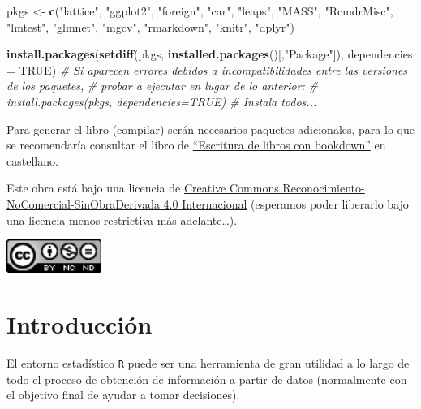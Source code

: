 \documentclass[]{book}
\newenvironment{Shaded}{\begin{snugshade}}{\end{snugshade}}
\newcommand{\CommentTok}[1]{\textcolor[rgb]{0.56,0.35,0.01}{\textit{#1}}}
\newcommand{\DataTypeTok}[1]{\textcolor[rgb]{0.13,0.29,0.53}{#1}}
\newcommand{\KeywordTok}[1]{\textcolor[rgb]{0.13,0.29,0.53}{\textbf{#1}}}
\newcommand{\NormalTok}[1]{#1}
\newcommand{\OtherTok}[1]{\textcolor[rgb]{0.56,0.35,0.01}{#1}}
\newcommand{\StringTok}[1]{\textcolor[rgb]{0.31,0.60,0.02}{#1}}
\begin{document}
\begin{Shaded}
\begin{Highlighting}[]
\NormalTok{pkgs <-}\StringTok{ }\KeywordTok{c}\NormalTok{(}\StringTok{"lattice"}\NormalTok{, }\StringTok{"ggplot2"}\NormalTok{, }\StringTok{"foreign"}\NormalTok{, }\StringTok{"car"}\NormalTok{, }\StringTok{"leaps"}\NormalTok{, }\StringTok{"MASS"}\NormalTok{, }\StringTok{"RcmdrMisc"}\NormalTok{, }
          \StringTok{"lmtest"}\NormalTok{, }\StringTok{"glmnet"}\NormalTok{, }\StringTok{"mgcv"}\NormalTok{, }\StringTok{"rmarkdown"}\NormalTok{, }\StringTok{"knitr"}\NormalTok{, }\StringTok{"dplyr"}\NormalTok{)}

\KeywordTok{install.packages}\NormalTok{(}\KeywordTok{setdiff}\NormalTok{(pkgs, }\KeywordTok{installed.packages}\NormalTok{()[,}\StringTok{"Package"}\NormalTok{]), }\DataTypeTok{dependencies =} \OtherTok{TRUE}\NormalTok{)}
\CommentTok{# Si aparecen errores debidos a incompatibilidades entre las versiones de los paquetes, }
\CommentTok{# probar a ejecutar en lugar de lo anterior:}
\CommentTok{# install.packages(pkgs, dependencies=TRUE) # Instala todos...}
\end{Highlighting}
\end{Shaded}

Para generar el libro (compilar) serán necesarios paquetes adicionales,
para lo que se recomendaría consultar el libro de \href{https://rubenfcasal.github.io/bookdown_intro}{``Escritura de libros con bookdown''} en castellano.

Este obra está bajo una licencia de \href{https://creativecommons.org/licenses/by-nc-nd/4.0/deed.es_ES}{Creative Commons Reconocimiento-NoComercial-SinObraDerivada 4.0 Internacional}
(esperamos poder liberarlo bajo una licencia menos restrictiva más adelante\ldots{}).

\includegraphics[width=1.22in]{by-nc-nd-88x31}

\hypertarget{introduccion}{%
\chapter{Introducción}\label{introduccion}}

El entorno estadístico \texttt{R} puede ser una herramienta de gran
utilidad a lo largo de todo el proceso de obtención de información
a partir de datos (normalmente con el objetivo final de ayudar a tomar decisiones).
\end{document}
